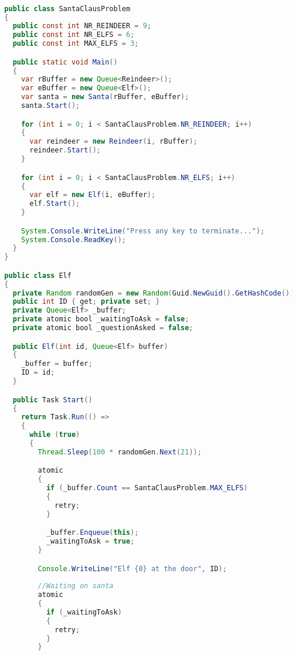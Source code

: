 \begin{lstlisting}[label=lst:impl_dining_lib,
  caption={\stmname Based Santa Claus Implementation},
  language=Java,  
  showspaces=false,
  showtabs=false,
  breaklines=true,
  showstringspaces=false,
  breakatwhitespace=true,
  commentstyle=\color{greencomments},
  keywordstyle=\color{bluekeywords},
  stringstyle=\color{redstrings},
  escapechar=~,
  morekeywords={atomic, retry, orelse, var, get, set, ref, out, readonly, virtual, override, region, endregion, foreach, lock}]  % Start your code-block

  public class SantaClausProblem
  {
    public const int NR_REINDEER = 9;
    public const int NR_ELFS = 6;
    public const int MAX_ELFS = 3;

    public static void Main()
    {
      var rBuffer = new Queue<Reindeer>();
      var eBuffer = new Queue<Elf>();
      var santa = new Santa(rBuffer, eBuffer);
      santa.Start();

      for (int i = 0; i < SantaClausProblem.NR_REINDEER; i++)
      {
        var reindeer = new Reindeer(i, rBuffer);
        reindeer.Start();
      }

      for (int i = 0; i < SantaClausProblem.NR_ELFS; i++)
      {
        var elf = new Elf(i, eBuffer);
        elf.Start();
      }

      System.Console.WriteLine("Press any key to terminate...");
      System.Console.ReadKey();
    }
  }

  public class Elf
  {
    private Random randomGen = new Random(Guid.NewGuid().GetHashCode());
    public int ID { get; private set; }
    private Queue<Elf> _buffer;
    private atomic bool _waitingToAsk = false;
    private atomic bool _questionAsked = false;

    public Elf(int id, Queue<Elf> buffer)
    {
      _buffer = buffer;
      ID = id;
    }

    public Task Start()
    {
      return Task.Run(() =>
      {
        while (true)
        {
          Thread.Sleep(100 * randomGen.Next(21));

          atomic
          {
            if (_buffer.Count == SantaClausProblem.MAX_ELFS)
            {
              retry;
            }

            _buffer.Enqueue(this);
            _waitingToAsk = true;
          }

          Console.WriteLine("Elf {0} at the door", ID);
          
          //Waiting on santa
          atomic
          {
            if (_waitingToAsk)
            {
              retry;
            }
          }


\end{lstlisting}
